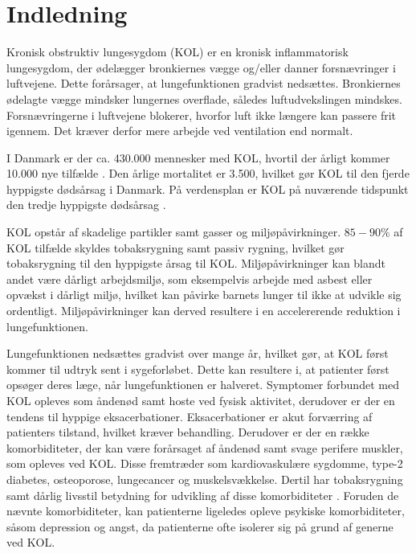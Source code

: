 \chapter{Indledning} 
Kronisk obstruktiv lungesygdom (KOL) er en kronisk inflammatorisk lungesygdom, der ødelægger bronkiernes vægge og/eller danner forsnævringer i luftvejene. Dette forårsager, at lungefunktionen gradvist nedsættes.\cite{Basisbogen2016} Bronkiernes ødelagte vægge mindsker lungernes overflade, således luftudvekslingen mindskes. Forsnævringerne i luftvejene blokerer, hvorfor luft ikke længere kan passere frit igennem. Det kræver derfor mere arbejde ved ventilation end normalt.\cite{Lungeforeningen2016}

I Danmark er der ca. 430.000 mennesker med KOL, hvortil der årligt kommer 10.000 nye tilfælde \cite{Sygdomsbyrden2015}. Den årlige mortalitet er 3.500, hvilket gør KOL til den fjerde hyppigste dødsårsag i Danmark.\cite{Basisbogen2016} På verdensplan er KOL på nuværende tidspunkt den tredje hyppigste dødsårsag \cite{WHO2017}.

KOL opstår af skadelige partikler samt gasser og miljøpåvirkninger. $85-90\%$ af KOL tilfælde skyldes tobaksrygning samt passiv rygning, hvilket gør tobaksrygning til den hyppigste årsag til KOL.\cite{Basisbogen2016,dsam2016,Martinez2016,Sygdomsbyrden2015}
Miljøpåvirkninger kan blandt andet være dårligt arbejdsmiljø, som eksempelvis arbejde med asbest eller opvækst i dårligt miljø, hvilket kan påvirke barnets lunger til ikke at udvikle sig ordentligt. Miljøpåvirkninger kan derved resultere i en accelererende reduktion i lungefunktionen.\cite{Martinez2016}

Lungefunktionen nedsættes gradvist over mange år, hvilket gør, at KOL først kommer til udtryk sent i sygeforløbet. Dette kan resultere i, at patienter først opsøger deres læge, når lungefunktionen er halveret.\cite{dsam2016} Symptomer forbundet med KOL opleves som åndenød samt hoste ved fysisk aktivitet, derudover er der en tendens til hyppige eksacerbationer. Eksacerbationer er akut forværring af patienters tilstand, hvilket kræver behandling.\cite{Basisbogen2016,dsam2016}
Derudover er der en række komorbiditeter, der kan være forårsaget af åndenød samt svage perifere muskler, som opleves ved KOL. Disse fremtræder som kardiovaskulære sygdomme, type-2 diabetes, osteoporose, lungecancer og muskelsvækkelse.\cite{dsam2016} Dertil har tobaksrygning samt dårlig livsstil betydning for udvikling af disse komorbiditeter \cite{McCarthy2015}. Foruden de nævnte komorbiditeter, kan patienterne ligeledes opleve psykiske komorbiditeter, såsom depression og angst, da patienterne ofte isolerer sig på grund af generne ved KOL.\cite{dsam2016}

